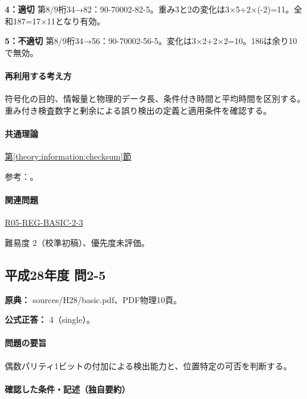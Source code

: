 \noindent\textbf{4：適切} 第8/9桁34→82：90-70002-82-5。重み3と2の変化は3×5+2×(-2)=\allowbreak{}11。全和187=\allowbreak{}17×11となり有効。\par

\noindent\textbf{5：不適切} 第8/9桁34→56：90-70002-56-5。変化は3×2+2×2=\allowbreak{}10。186は余り10で無効。\par

\paragraph{再利用する考え方} 符号化の目的、情報量と物理的データ長、条件付き時間と平均時間を区別する。重み付き検査数字と剰余による誤り検出の定義と適用条件を確認する。

\paragraph{共通理論} \hyperref[theory:information:checksum]{第\ref*{theory:information:checksum}節}

\par 参考：\cite{info_errors}。

\paragraph{関連問題} \hyperref[q:r05-reg-basic-2-3]{R05-REG-BASIC-2-3}

\par 難易度 2（校準初稿）、優先度未評価。

\subsection{平成28年度 問2-5}
\label{q:h28-reg-basic-2-5}

\noindent\textbf{原典：} sources/H28/basic.pdf、PDF物理10頁。

\textbf{公式正答：} 4（single）。

\paragraph{問題の要旨} 偶数パリティ1ビットの付加による検出能力と、位置特定の可否を判断する。

\paragraph{確認した条件・記述（独自要約）}\mbox{}\par

